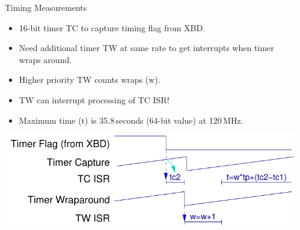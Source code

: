\documentclass[xcolor=pdftex,dvipsnames,table,final]{beamer}
\begin{document}
\begin{frame}[fragile]{}
\begin{columns}[t, totalwidth=\textwidth]
\begin{column}{.675\linewidth}
\begin{columns}
\begin{column}{.473\linewidth}
      \begin{block}{Timing Measurements}
        \begin{itemize}
          \item 16-bit timer TC to capture timing flag from XBD.
          \item Need additional timer TW at same rate to get interrupts when timer 
                wraps around.
          \item Higher priority TW counts wraps (w).
          \item TW can interrupt processing of TC ISR!
          \item Maximum time (t) is 35.8\,seconds (64-bit value) at 120\,MHz.
        \end{itemize}
        \begin{center}
          \includegraphics[scale=1.4]{./figures/timing}
        \end{center}
      \end{block}
	 
          
    \end{column}
   \begin{column}{.473\linewidth}
    

\end{column}
\end{columns}
\end{column}
\end{columns}
\end{frame}
\end{document}
